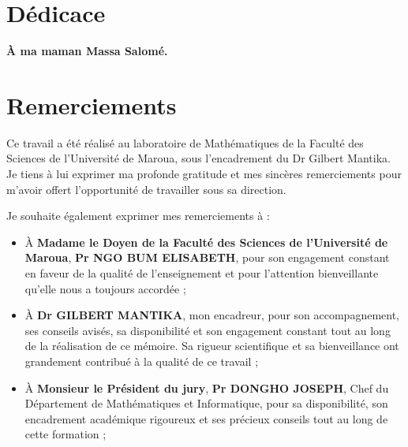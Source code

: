 \documentclass[a4paper, 14pt]{report}
\newcommand{\applyfontsize}{%
	\fontsize{12}{12}\selectfont
}
\begin{document}
\newpage
\begin{onehalfspace} %
\lhead{}
\rhead{}
\chead{}


\chapter*{Dédicace}

\begin{center}
\textbf{\textbf{ \LARGE À ma maman Massa Salomé.}}
\vspace{1cm} %
\end{center}

\chapter*{Remerciements}
{
	\applyfontsize %
	
Ce travail a été réalisé au laboratoire de Mathématiques de la Faculté des Sciences de l’Université de Maroua, sous l’encadrement du Dr Gilbert Mantika. Je tiens à lui exprimer ma profonde gratitude et mes sincères remerciements pour m’avoir offert l’opportunité de travailler sous sa direction.

Je souhaite également exprimer mes remerciements à :
\begin{itemize}
	\item À \textbf{Madame le Doyen de la Faculté des Sciences de l’Université de Maroua}, \textbf{Pr NGO BUM ELISABETH}, pour son engagement constant en faveur de la qualité de l’enseignement et pour l’attention bienveillante qu’elle nous a toujours accordée ;
	
	\item À \textbf{Dr GILBERT MANTIKA}, mon encadreur, pour son accompagnement, ses conseils avisés, sa disponibilité et son engagement constant tout au long de la réalisation de ce mémoire. Sa rigueur scientifique et sa bienveillance ont grandement contribué à la qualité de ce travail ;
	
	
	\item À \textbf{Monsieur le Président du jury}, \textbf{Pr DONGHO JOSEPH}, Chef du Département de Mathématiques et Informatique, pour sa disponibilité, son encadrement académique rigoureux et ses précieux conseils tout au long de cette formation ;
	

\end{itemize}}
\end{onehalfspace}
\end{document}
